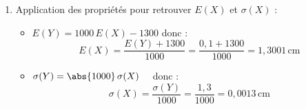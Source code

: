 \begin{methode}
\begin{correction}
\begin{enumerate}
			\item Application des propriétés pour retrouver $E(X)$ et $\sigma(X)$ :
			      \begin{itemize}
				      \item $E(Y) = 1000\,E(X) - 1300$ donc :
				            \[
					            E(X) = \dfrac{E(Y) + 1300}{1000} = \dfrac{0{,}1 + 1300}{1000} = 1{,}3001\,\text{cm}
				            \]

				      \item $\sigma(Y) = \abs{1000} \, \sigma(X)\quad$ donc :
				            \[
					            \sigma(X) = \dfrac{\sigma(Y)}{1000} = \dfrac{1{,}3}{1000} = 0{,}0013\,\text{cm}
				            \]
			      \end{itemize}
		\end{enumerate}
	\end{correction}
\end{methode}

